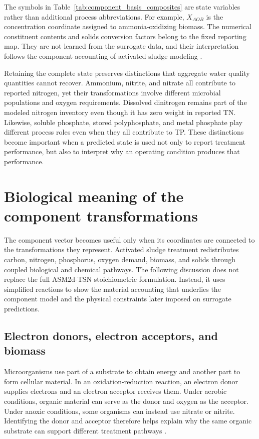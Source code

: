 The symbols in Table~\ref{tab:component_basis_composites} are state variables rather than additional process abbreviations. For example, $X_{AOB}$ is the concentration coordinate assigned to ammonia-oxidizing biomass. The numerical constituent contents and solids conversion factors belong to the fixed reporting map. They are not learned from the surrogate data, and their interpretation follows the component accounting of activated sludge modeling \citep{Henze2006}.

Retaining the complete state preserves distinctions that aggregate water quality quantities cannot recover. Ammonium, nitrite, and nitrate all contribute to reported nitrogen, yet their transformations involve different microbial populations and oxygen requirements. Dissolved dinitrogen remains part of the modeled nitrogen inventory even though it has zero weight in reported TN. Likewise, soluble phosphate, stored polyphosphate, and metal phosphate play different process roles even when they all contribute to TP. These distinctions become important when a predicted state is used not only to report treatment performance, but also to interpret why an operating condition produces that performance.


\section{Biological meaning of the component transformations}

The component vector becomes useful only when its coordinates are connected to the transformations they represent. Activated sludge treatment redistributes carbon, nitrogen, phosphorus, oxygen demand, biomass, and solids through coupled biological and chemical pathways. The following discussion does not replace the full ASM2d-TSN stoichiometric formulation. Instead, it uses simplified reactions to show the material accounting that underlies the component model and the physical constraints later imposed on surrogate predictions.

\subsection{Electron donors, electron acceptors, and biomass}

Microorganisms use part of a substrate to obtain energy and another part to form cellular material. In an oxidation-reduction reaction, an electron donor supplies electrons and an electron acceptor receives them. Under aerobic conditions, organic material can serve as the donor and oxygen as the acceptor. Under anoxic conditions, some organisms can instead use nitrate or nitrite. Identifying the donor and acceptor therefore helps explain why the same organic substrate can support different treatment pathways \citep{Narayanan2019,Preena2021}.

